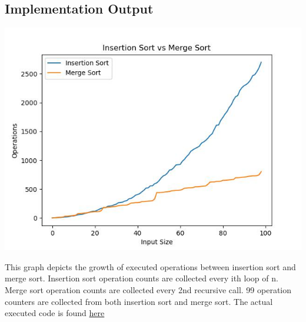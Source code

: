 \documentclass{article}
\begin{document}
\subsection{Implementation Output}
\begin{center}
\includegraphics[scale=0.5]{complexity.jpg}
    
\end{center}
This graph depicts the growth of executed operations between insertion sort and merge sort. Insertion sort operation counts are collected every ith loop of n. Merge sort operation counts are collected every 2nd recursive call. 99 operation counters are collected from both insertion sort and merge sort. The actual executed code is found  \href{https://github.com/Tony363/5511/blob/main/hw1/hw1_code.py}{here}
\printbibliography
\end{document}
